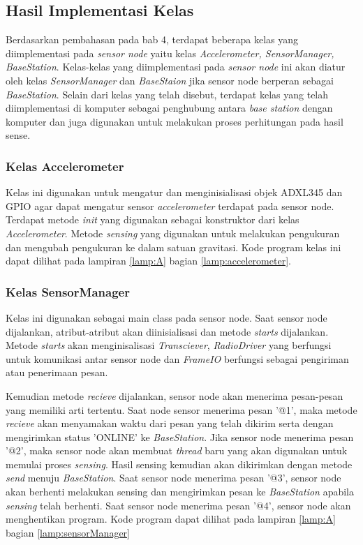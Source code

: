 \subsection{Hasil Implementasi Kelas}

Berdasarkan pembahasan pada bab 4, terdapat beberapa kelas yang diimplementasi pada \textit{sensor node} yaitu kelas \textit{Accelerometer, SensorManager, BaseStation}. Kelas-kelas yang diimplementasi pada \textit{sensor node} ini akan diatur oleh kelas \textit{SensorManager} dan \textit{BaseStaion} jika sensor node berperan sebagai \textit{BaseStation}. Selain dari kelas yang telah disebut, terdapat kelas yang telah diimplementasi di komputer sebagai penghubung antara \textit{base station} dengan komputer dan juga digunakan untuk melakukan proses perhitungan pada hasil sense.

\subsubsection{Kelas Accelerometer}
Kelas ini digunakan untuk mengatur dan menginisialisasi objek ADXL345 dan GPIO agar dapat mengatur sensor \textit{accelerometer} terdapat pada sensor node. Terdapat metode \textit{init} yang digunakan sebagai konstruktor dari kelas \textit{Accelerometer}. Metode \textit{sensing} yang digunakan untuk melakukan pengukuran dan mengubah pengukuran ke dalam satuan gravitasi. Kode program kelas ini dapat dilihat pada lampiran \ref{lamp:A} bagian \ref{lamp:accelerometer}.


\subsubsection{Kelas SensorManager}
Kelas ini digunakan sebagai main class pada sensor node. Saat sensor node dijalankan, atribut-atribut akan diinisialisasi dan metode \textit{starts} dijalankan. Metode \textit{starts} akan menginisalisasi \textit{Transciever}, \textit{RadioDriver} yang berfungsi untuk komunikasi antar sensor node dan \textit{FrameIO} berfungsi sebagai pengiriman atau penerimaan pesan. 

Kemudian metode \textit{recieve} dijalankan, sensor node akan menerima pesan-pesan yang memiliki arti tertentu. Saat node sensor menerima pesan '@1', maka metode \textit{recieve} akan menyamakan waktu dari pesan yang telah dikirim serta dengan mengirimkan status 'ONLINE' ke \textit{BaseStation}. Jika sensor node menerima pesan '@2', maka sensor node akan membuat \textit{thread} baru yang akan digunakan untuk memulai proses \textit{sensing}. Hasil sensing kemudian akan dikirimkan dengan metode \textit{send} menuju \textit{BaseStation}. Saat sensor node menerima pesan '@3', sensor node akan berhenti melakukan sensing dan mengirimkan pesan ke \textit{BaseStation} apabila \textit{sensing} telah berhenti. Saat sensor node menerima pesan '@4', sensor node akan menghentikan program. Kode program dapat dilihat pada lampiran \ref{lamp:A} bagian \ref{lamp:sensorManager}

